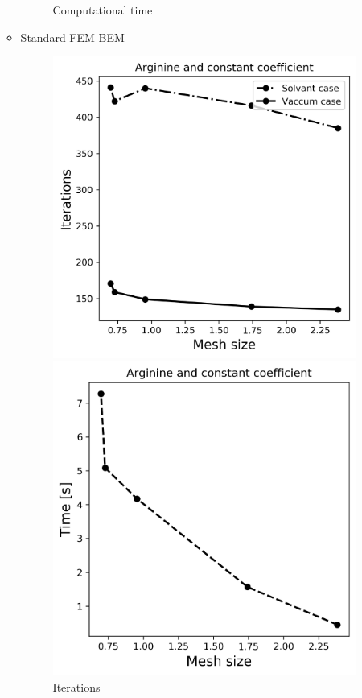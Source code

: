 \begin{itemize}
\begin{itemize}
\begin{figure}[!htb]
  \caption{Computational time}
\endminipage
\end{figure}
        \item Standard FEM-BEM
\begin{figure}[!htb]
  \includegraphics[width=\linewidth]{FEM_BEM_Arginine_const_coeff_iter.png}
  \caption{Iterations}
\endminipage\hfill
{}%
  \includegraphics[width=\linewidth]{FEM_BEM_Arginine_const_coeff_time.png}

\end{figure}
\end{itemize}
\end{itemize}
